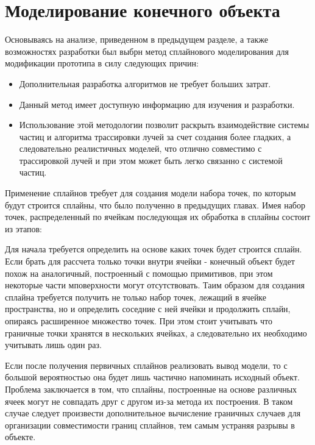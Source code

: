 \section{Моделирование конечного объекта}

Основываясь на анализе, приведенном в предыдущем разделе, а также возможностях разработки был выбрн метод сплайнового моделирования для модификации прототипа в силу следующих причин:

\begin{itemize}
	\item Дополнительная разработка алгоритмов не требует больших затрат.
	\item Данный метод имеет доступную информацию для изучения и разработки.
	\item Использование этой методологии позволит раскрыть взаимодействие системы частиц и алгоритма трассировки лучей за счет создания более гладких, а следовательно реалистичных моделей, что отлично совместимо с трассировкой лучей и при этом может быть легко связанно с системой частиц.
\end{itemize} 

Применение сплайнов требует для создания модели набора точек, по которым будут строится сплайны, что было полученно в предыдущих главах. Имея набор точек, распределенный по ячейкам последующая их обработка в сплайны состоит из этапов:

Для начала требуется определить на основе каких точек будет строится сплайн. Если брать для рассчета только точки внутри ячейки - конечный объект будет похож на аналогичный, построенный с помощью примитивов, при этом некоторые части мповерхности могут отсутствовать. Таим образом для создания сплайна требуется получить не только набор точек, лежащий в ячейке пространства, но и определить соседние с ней ячейки и продолжить сплайн, опираясь расширенное множество точек. При этом стоит учитывать что граничные точки хранятся в нескольких ячейках, а следовательно их необходимо учитывать лишь один раз.

Если после получения первичных сплайнов реализовать вывод модели, то с большой вероятностью она будет лишь частично напоминать исходный объект. Проблема заключается в том, что сплайны, построенные на основе различных ячеек могут не совпадать друг с другом из-за метода их построения. В таком случае следует произвести дополнительное вычисление граничных случаев для организации совместимости границ сплайнов, тем самым устраняя разрывы в объекте.

